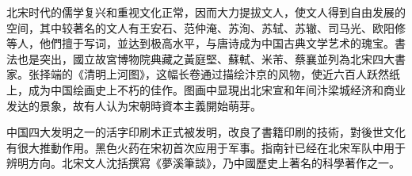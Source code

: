 北宋时代的儒学复兴和重视文化正常，因而大力提拔文人，使文人得到自由发展的空间，其中较著名的文人有王安石、范仲淹、苏洵、苏轼、苏辙、司马光、欧阳修等人，他們擅于写词，並达到极高水平，与唐诗成为中国古典文学艺术的瑰宝。書法也是突出，國立故宮博物院典藏之黃庭堅、蘇軾、米芾、蔡襄並列為北宋四大書家。张择端的《清明上河图》，这幅长卷通过描绘汴京的风物，使近六百人跃然纸上，成为中国绘画史上不朽的佳作。图画中显現出北宋宣和年间汴梁城经济和商业发达的景象，故有人认为宋朝時資本主義開始萌芽。

中国四大发明之一的活字印刷术正式被发明，改良了書籍印刷的技術，對後世文化有很大推動作用。黑色火药在宋初首次应用于军事。指南针已经在北宋军队中用于辨明方向。北宋文人沈括撰寫《夢溪筆談》，乃中國歷史上著名的科學著作之一。












